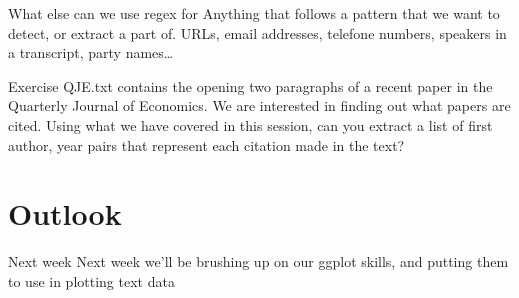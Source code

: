 \documentclass[
  10pt,
  ignorenonframetext,
  aspectratio=169]{beamer}
\newif\ifbibliography
\begin{document}
\begin{frame}{What else can we use regex for}
\protect\hypertarget{what-else-can-we-use-regex-for}{}
Anything that follows a pattern that we want to detect, or extract a
part of. URLs, email addresses, telefone numbers, speakers in a
transcript, party names\ldots{}
\end{frame}

\begin{frame}{Exercise}
\protect\hypertarget{exercise-1}{}
QJE.txt contains the opening two paragraphs of a recent paper in the
Quarterly Journal of Economics. We are interested in finding out what
papers are cited. Using what we have covered in this session, can you
extract a list of first author, year pairs that represent each citation
made in the text?
\end{frame}

\hypertarget{outlook}{%
\section{Outlook}\label{outlook}}

\begin{frame}{Next week}
\protect\hypertarget{next-week}{}
Next week we'll be brushing up on our ggplot skills, and putting them to
use in plotting text data
\end{frame}

\begin{frame}[allowframebreaks]{}
  \bibliographytrue
  
\end{frame}
\end{document}
